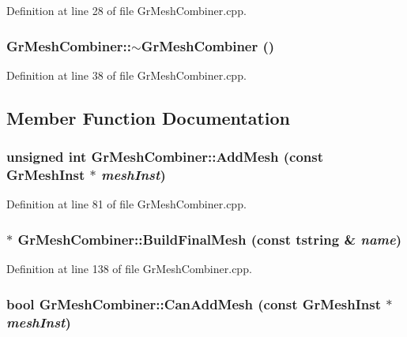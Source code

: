 Definition at line 28 of file GrMeshCombiner.cpp.\hypertarget{class_gr_mesh_combiner_58fea974a680d1ce4b5038138d92db61}{
\subsubsection[{$\sim$GrMeshCombiner}]{\setlength{\rightskip}{0pt plus 5cm}GrMeshCombiner::$\sim$GrMeshCombiner ()}}
\label{class_gr_mesh_combiner_58fea974a680d1ce4b5038138d92db61}




Definition at line 38 of file GrMeshCombiner.cpp.

\subsection{Member Function Documentation}
\hypertarget{class_gr_mesh_combiner_35a035d950b95e8a291fe2e333bb4e8a}{
\subsubsection[{AddMesh}]{\setlength{\rightskip}{0pt plus 5cm}unsigned int GrMeshCombiner::AddMesh (const {\bf GrMeshInst} $\ast$ {\em meshInst})}}
\label{class_gr_mesh_combiner_35a035d950b95e8a291fe2e333bb4e8a}




Definition at line 81 of file GrMeshCombiner.cpp.\hypertarget{class_gr_mesh_combiner_ec10305f0381d0eea825e5352bd48874}{
\subsubsection[{BuildFinalMesh}]{ $\ast$ GrMeshCombiner::BuildFinalMesh (const {\bf tstring} \& {\em name})}}
\label{class_gr_mesh_combiner_ec10305f0381d0eea825e5352bd48874}




Definition at line 138 of file GrMeshCombiner.cpp.\hypertarget{class_gr_mesh_combiner_1291e59a1c23b3cc1204b48a8728ad1f}{
\subsubsection[{CanAddMesh}]{\setlength{\rightskip}{0pt plus 5cm}bool GrMeshCombiner::CanAddMesh (const {\bf GrMeshInst} $\ast$ {\em meshInst})}}
\label{class_gr_mesh_combiner_1291e59a1c23b3cc1204b48a8728ad1f}




